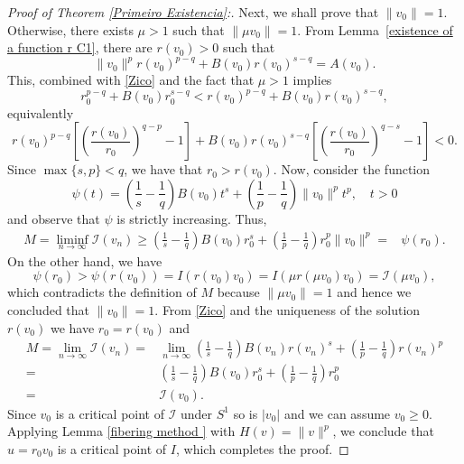 \documentclass[12pt,reqno]{amsart}
\begin{document}
\begin{proof}[Proof of Theorem \ref{Primeiro Existencia}:]
Next, we shall prove that  $\|v_0\|=1$. Otherwise, there exists $\mu>1$ such that $\|\mu v_0\|=1$. From Lemma~\ref{existence of a function r C1}, there are $r(v_0)>0$ such that 
$$
\|v_0\|^pr(v_0)^{p-q}+B(v_0)r(v_0)^{s-q}=A(v_0).
$$
This, combined with \eqref{Zico} and the fact that  $\mu>1$ implies 
$$
r_0^{p-q}+B(v_0)r_0^{s-q}<r(v_0)^{p-q}+B(v_0)r(v_0)^{s-q}, 
$$
equivalently 
$$
r(v_0)^{p-q}\left[\left(\frac{r(v_0)}{r_0}\right)^{q-p}-1\right]+B(v_0)r(v_0)^{s-q}\left[\left(\frac{r(v_0)}{r_0}\right)^{q-s}-1\right]<0.
$$
Since $\max\{s,p\}<q$, we have that $r_0>r(v_0)$. Now, consider the function 
\begin{equation*}
		\psi(t)=\left(\frac{1}{s}-\frac{1}{q}\right)B(v_0)t^s+\left(\frac{1}{p}-\frac{1}{q}\right)\|v_0\|^pt^p, \quad t>0
\end{equation*}
and observe that $\psi$ is strictly increasing. Thus,
\begin{align*}
M=\liminf_{n\rightarrow \infty}\mathcal{I}(v_n)\geq\left(\frac{1}{s}-\frac{1}{q}\right)B(v_0)r_0^s+\left(\frac{1}{p}-\frac{1}{q}\right)r_0^p\|v_0\|^p=&\psi(r_0).
\end{align*}
On the other hand, we have
\[
\psi(r_0)>\psi(r(v_0))=I(r(v_0)v_0)=I(\mu r(\mu v_0)v_0)=\mathcal{I}(\mu v_0),
\]
which contradicts the definition of $M$ because $\|\mu v_0\|=1$ and hence we concluded that $\|v_0\|=1$. From \eqref{Zico} and the uniqueness of the solution $r(v_0)$ we have $r_0=r(v_0)$ and
\begin{align*}
		M=\lim_{n \rightarrow \infty}\mathcal{I}(v_n)
		=& \lim_{n\rightarrow \infty} \left(\frac{1}{s}-\frac{1}{q}\right)B(v_n)r(v_n)^s+\left(\frac{1}{p}-\frac{1}{q}\right)r(v_n)^p\\
		=& \left(\frac{1}{s}-\frac{1}{q}\right)B(v_0)r_0^s+\left(\frac{1}{p}-\frac{1}{q}\right)r_0^p\\
		=& \mathcal{I}(v_0).
\end{align*}
Since $v_0$ is a critical point of $\mathcal{I}$ under $S^1$ so is $|v_0|$ and we can assume $v_0\geq0$. Applying Lemma \ref{fibering method } with $H(v)=\|v\|^p$, we conclude that  $u=r_0 v_0$ is a critical point of $I$, which completes the proof.
\end{proof}
\end{document}
